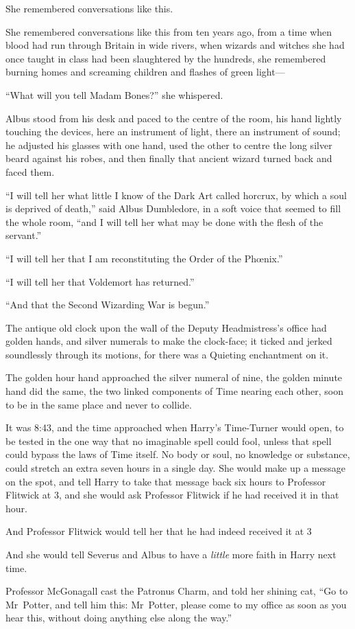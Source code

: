 She remembered conversations like this.

She remembered conversations like this from ten years ago, from a time when blood had run through Britain in wide rivers, when wizards and witches she had once taught in class had been slaughtered by the hundreds, she remembered burning homes and screaming children and flashes of green light—

“What will you tell Madam Bones?” she whispered.

Albus stood from his desk and paced to the centre of the room, his hand lightly touching the devices, here an instrument of light, there an instrument of sound; he adjusted his glasses with one hand, used the other to centre the long silver beard against his robes, and then finally that ancient wizard turned back and faced them.

“I will tell her what little I know of the Dark Art called horcrux, by which a soul is deprived of death,” said Albus Dumbledore, in a soft voice that seemed to fill the whole room, “and I will tell her what may be done with the flesh of the servant.”

“I will tell her that I am reconstituting the Order of the Phœnix.”

“I will tell her that Voldemort has returned.”

“And that the Second Wizarding War is begun.”


The antique old clock upon the wall of the Deputy Headmistress’s office had golden hands, and silver numerals to make the clock-face; it ticked and jerked soundlessly through its motions, for there was a Quieting enchantment on it.

The golden hour hand approached the silver numeral of nine, the golden minute hand did the same, the two linked components of Time nearing each other, soon to be in the same place and never to collide.

It was 8:43\pm, and the time approached when Harry’s Time-Turner would open, to be tested in the one way that no imaginable spell could fool, unless that spell could bypass the laws of Time itself. No body or soul, no knowledge or substance, could stretch an extra seven hours in a single day. She would make up a message on the spot, and tell Harry to take that message back six hours to Professor Flitwick at 3\pm, and she would ask Professor Flitwick if he had received it in that hour.

And Professor Flitwick would tell her that he had indeed received it at 3\pm

And she would tell Severus and Albus to have a \emph{little} more faith in Harry next time.

Professor McGonagall cast the Patronus Charm, and told her shining cat, “Go to Mr~Potter, and tell him this: Mr~Potter, please come to my office as soon as you hear this, without doing anything else along the way.”

